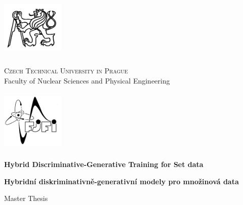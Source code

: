 \def\documentdate{May 2, 2022}


\pagestyle{empty}
{\centering

\noindent %
\begin{minipage}[c]{3cm}%
\noindent \begin{center}
\includegraphics[width=3cm,height=3cm,keepaspectratio]{plots/Images/TITLE/cvut}
\par\end{center}%
\end{minipage}%
\begin{minipage}[c]{0.6\linewidth}%
\begin{center}
\textsc{\large{}Czech Technical University in Prague}{\large{}}\\
{\large{}Faculty of Nuclear Sciences and Physical Engineering}
\par\end{center}%
\end{minipage}%
\begin{minipage}[c]{3cm}%
\noindent \begin{center}
\includegraphics[width=3cm,height=3cm,keepaspectratio]{plots/Images/TITLE/fjfi}
\par\end{center}%
\end{minipage}

\vspace{3cm}

\textbf{\huge{}Hybrid Discriminative-Generative Training for Set data}{\huge\par}

\vspace{1cm}

%
\textbf{\huge{}Hybridní diskriminativně-generativní modely pro množinová data}{\huge\par}

%
\vspace{2cm}

{\large{}Master Thesis}{\large\par}

}

